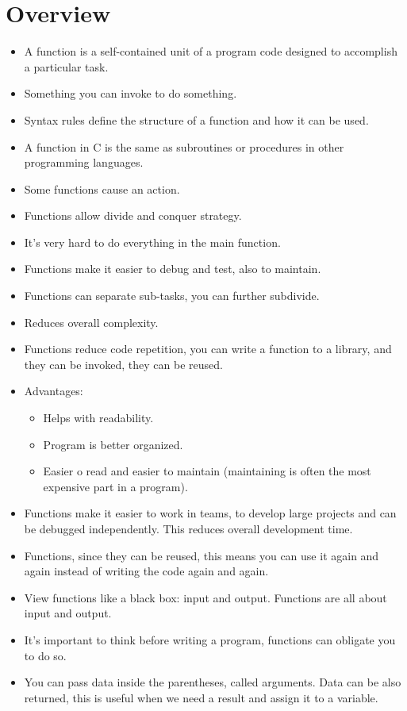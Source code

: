 \section{Overview}
\begin{itemize}
    \item A function is a self-contained unit of a program code designed to accomplish a particular task.
    \item Something you can invoke to do something. 
    \item Syntax rules define the structure of a function and how it can be used.
    \item A function in C is the same as subroutines or procedures in other programming languages. 
    \item Some functions cause an action.
    \item Functions allow divide and conquer strategy. 
    \item It's very hard to do everything in the main function. 
    \item Functions make it easier to debug and test, also to maintain. 
    \item Functions can separate sub-tasks, you can further subdivide.
    \item Reduces overall complexity. 
    \item Functions reduce code repetition, you can write a function to a library, and they can be invoked, they can be reused. 
    \item Advantages: 
        \begin{itemize}
            \item Helps with readability. 
            \item Program is better organized. 
            \item Easier o read and easier to maintain (maintaining is often the most expensive part in a program).
        \end{itemize}
    
    \item Functions make it easier to work in teams, to develop large projects and can be debugged independently. This reduces overall development time. 
    \item Functions, since they can be reused, this means you can use it again and again instead of writing the code again and again. 
    \item View functions like a black box: input and output. Functions are all about input and output. 
    \item It's important to think before writing a program, functions can obligate you to do so. 
    \item You can pass data inside the parentheses, called arguments. Data can be also returned, this is useful when we need a result and assign it to a variable. 
\end{itemize}
